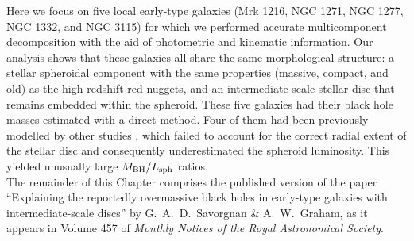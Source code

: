 Here we focus on five local early-type galaxies (Mrk 1216, NGC 1271, NGC 1277, NGC 1332, and NGC 3115) 
for which we performed accurate multicomponent decomposition 
with the aid of photometric and kinematic information. 
Our analysis shows that these galaxies all share the same morphological structure: 
a stellar spheroidal component with the same properties (massive, compact, and old) as the high-redshift red nuggets, 
and an intermediate-scale stellar disc that remains embedded within the spheroid. 
These five galaxies had their black hole masses estimated with a direct method.  
Four of them had been previously modelled by other studies \citep{rusli2011,vandenbosch2012,walsh2015,yildirim2015}, 
which failed to account for the correct radial extent of the stellar disc 
and consequently underestimated the spheroid luminosity.
This yielded unusually large $M_{\rm BH} / L_{\rm sph}$ ratios.  \\

The remainder of this Chapter comprises the published version of the paper 
``Explaining the reportedly overmassive black holes in early-type galaxies with intermediate-scale discs'' 
by G.~A.~D.~Savorgnan \& A.~W.~Graham,  
as it appears in Volume 457 of \emph{Monthly Notices of the Royal Astronomical Society}. 


